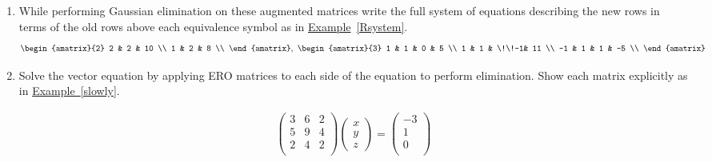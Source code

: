 


\begin{enumerate}

\item While performing  Gaussian elimination on these augmented matrices write the full system of equations describing the new rows in terms of the old rows above each equivalence symbol as in  \hyperlink{Keeping track of EROs with equations between rows}{Example}~\ref{Rsystem}. 
\[
\begin{amatrix}{2} 
2 & 2 & 10 \\
1 & 2 & 8 \\
\end{amatrix}
,~
\begin{amatrix}{3} 
1 & 1 & 0 & 5 \\
1 & 1 & \!\!-1& 11 \\
-1 & 1 & 1 & -5 \\ 
\end{amatrix}
\]


\item Solve the vector equation by applying ERO matrices to each side of the equation to perform elimination. Show each matrix explicitly as in \hyperlink{Undoing}{Example~\ref{slowly}}.

\begin{eqnarray*}
\begin{pmatrix}
3	&6 	&2 \\ %
5 	&9 	&4 \\ %
2	&4	&2 \\ %
\end{pmatrix} 
\begin{pmatrix}
 x \\ 
y \\
z 
\end{pmatrix} 
=
\begin{pmatrix}
-3 \\ 
1  \\
0  \\
\end{pmatrix} 
\end{eqnarray*}



\end{enumerate}
